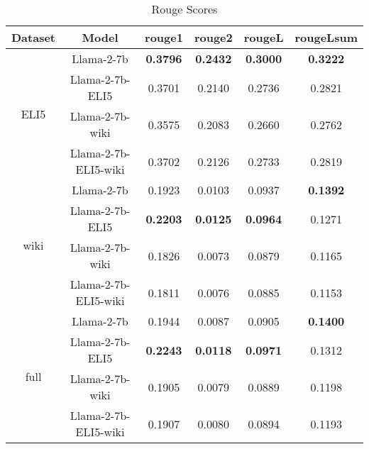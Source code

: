 \documentclass[11pt, oneside]{article}   	%
\begin{document}
\begin{table}[htbp]
\centering
\begin{tabular}{cccccc}
\toprule
\textbf{Dataset} & \textbf{Model} & \textbf{rouge1} & \textbf{rouge2} & \textbf{rougeL} & \textbf{rougeLsum} \\
\midrule
\multirow{4}{*}{ELI5} & Llama-2-7b & \textbf{0.3796} & \textbf{0.2432} & \textbf{0.3000} & \textbf{0.3222} \\
& Llama-2-7b-ELI5 & 0.3701 & 0.2140 & 0.2736 & 0.2821 \\
& Llama-2-7b-wiki & 0.3575 & 0.2083 & 0.2660 & 0.2762 \\
& Llama-2-7b-ELI5-wiki & 0.3702 & 0.2126 & 0.2733 & 0.2819 \\
\midrule
\multirow{4}{*}{wiki} & Llama-2-7b & 0.1923 & 0.0103 & 0.0937 & \textbf{0.1392} \\
& Llama-2-7b-ELI5 & \textbf{0.2203} & \textbf{0.0125} & \textbf{0.0964} & 0.1271 \\
& Llama-2-7b-wiki & 0.1826 & 0.0073 & 0.0879 & 0.1165 \\
& Llama-2-7b-ELI5-wiki & 0.1811 & 0.0076 & 0.0885 & 0.1153 \\
\midrule
\multirow{4}{*}{full} & Llama-2-7b & 0.1944 & 0.0087 & 0.0905 & \textbf{0.1400} \\
& Llama-2-7b-ELI5 & \textbf{0.2243} & \textbf{0.0118} & \textbf{0.0971} & 0.1312 \\
& Llama-2-7b-wiki & 0.1905 & 0.0079 & 0.0889 & 0.1198 \\
&Llama-2-7b-ELI5-wiki & 0.1907 & 0.0080 & 0.0894 & 0.1193 \\
\bottomrule
\end{tabular}
\caption{Rouge Scores}
\label{tab:rouge_scores}
\end{table}
\end{document}
